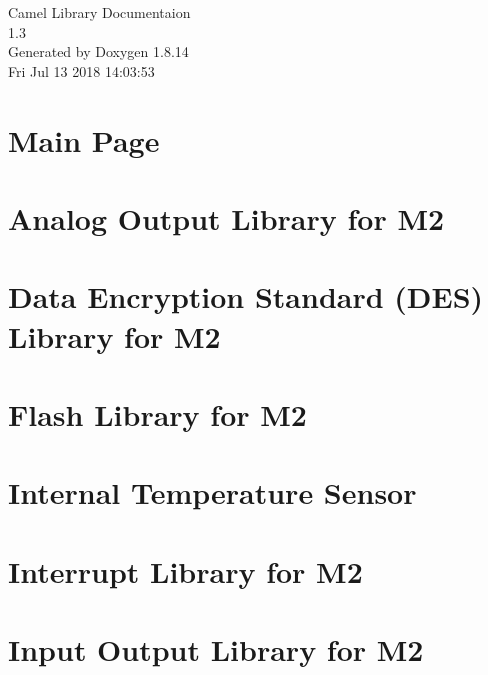 \documentclass[twoside]{article}
\newcommand{\+}{\discretionary{\mbox{\scriptsize$\hookleftarrow$}}{}{}}
\begin{document}
\hypersetup{pageanchor=false,
             bookmarksnumbered=true,
             pdfencoding=unicode
            }
\begin{titlepage}
\vspace*{7cm}
\begin{center}%
{\Large Camel Library Documentaion \\[1ex]\large 1.\+3 }\\
\vspace*{1cm}
{\large Generated by Doxygen 1.8.14}\\
\vspace*{0.5cm}
{\small Fri Jul 13 2018 14:03:53}\\
\end{center}
\end{titlepage}
\tableofcontents
{}
\hypersetup{pageanchor=true}

\section{Main Page}
\label{index}\hypertarget{index}{}
\section{Analog Output Library for M2}
\label{a00139}

\section{Data Encryption Standard (D\+ES) Library for M2}
\label{a00140}

\section{Flash Library for M2}
\label{a00141}

\section{Internal Temperature Sensor}
\label{a00142}

\section{Interrupt Library for M2}
\label{a00143}

\section{Input Output Library for M2}
\label{a00144}

\end{document}
